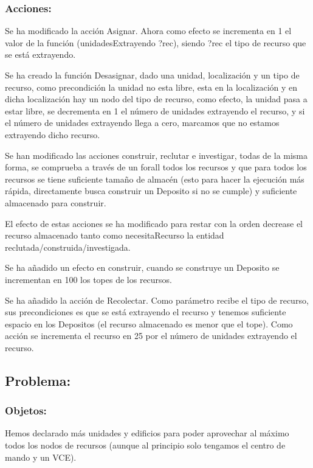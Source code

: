 \documentclass[10pt, spanish]{article}
\begin{document}
\subsubsection{Acciones:}

Se ha modificado la acción Asignar. Ahora como efecto se incrementa en 1 el valor de la función (unidadesExtrayendo ?rec), siendo ?rec el tipo de recurso que se está extrayendo.

Se ha creado la función Desasignar,  dado una unidad, localización y un tipo de recurso, como precondición la unidad no esta libre, esta en la localización y en dicha localización hay un nodo del tipo de recurso, como efecto, la unidad pasa a estar libre, se decrementa en 1 el número de unidades extrayendo el recurso, y si el número de unidades extrayendo llega a cero, marcamos que no estamos extrayendo dicho recurso.

Se han modificado las acciones construir, reclutar e investigar, todas de la misma forma, se comprueba a través de un forall todos los recursos y que para todos los recursos se tiene suficiente tamaño de almacén (esto para hacer la ejecución más rápida, directamente busca construir un Deposito si no se cumple) y suficiente almacenado para construir.

El efecto de estas acciones se ha modificado para restar con la orden decrease el recurso almacenado tanto como necesitaRecurso la entidad reclutada/construida/investigada.

Se ha añadido un efecto en construir, cuando se construye un Deposito se incrementan en 100 los topes de los recursos.

Se ha añadido la acción de Recolectar. Como parámetro recibe el tipo de recurso, sus precondiciones es que se está extrayendo el recurso y tenemos suficiente espacio en los Depositos (el recurso almacenado es menor que el tope). Como acción se incrementa el recurso en 25 por el número de unidades extrayendo el recurso.

\subsection{Problema:}

\subsubsection{Objetos:}

Hemos declarado más unidades y edificios para poder aprovechar al máximo todos los nodos de recursos (aunque al principio solo tengamos el centro de mando y un VCE).
\end{document}
